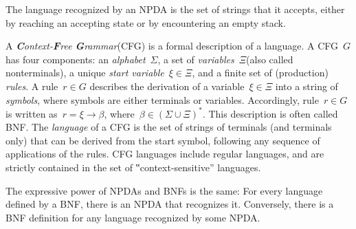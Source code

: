 The language recognized by an NPDA is the set of strings that it accepts,
  either by reaching an accepting state or by encountering an empty stack.

A \emph{\textbf Context-\textbf Free \textbf Grammar}(CFG) is a formal description of a language.
A CFG~$G$ has four components: an \emph{alphabet}~$\Sigma$,
a set of \emph{variables}~$Ξ$(also called nonterminals), a unique \emph{start variable}~$ξ∈Ξ$, and
  a finite set of (production) \emph{rules}.
A rule~$r∈G$ describes the derivation of a variable~$ξ∈Ξ$ into
  a string of \emph{symbols}, where symbols are either terminals or variables.
Accordingly, rule~$r∈G$ is written as~$r=ξ→β$, where~$β∈\left(Σ∪Ξ\right)^*$.
This description is often called BNF.
The \emph{language} of a CFG is the set of strings of terminals (and terminals only)
  that can be derived from the start symbol, following any sequence of applications of the rules.
CFG languages include regular languages, and are strictly contained in the set
  of ‟context-sensitive” languages.

The expressive power of NPDAs and BNFs is the same:
  For every language defined by a BNF, there is an NPDA that recognizes it.
Conversely, there is a BNF definition for any language recognized by some NPDA.


